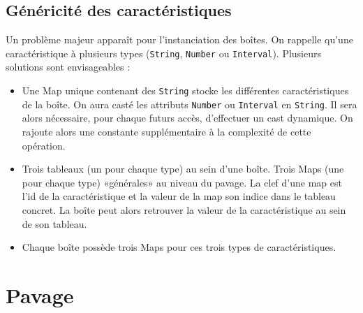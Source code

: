 
\subsection{Généricité des caractéristiques}
Un problème majeur apparaît pour l'instanciation des boîtes. On rappelle qu'une caractéristique à plusieurs types (\verb+String+, \verb+Number+ ou \verb+Interval+). Plusieurs solutions sont envisageables : 
\begin{itemize}
\item
  Une Map unique contenant des \verb+String+ stocke les différentes caractéristiques de la boîte. On aura casté les attributs \verb+Number+ ou \verb+Interval+ en \verb+String+. Il sera alors nécessaire, pour chaque futurs accès, d'effectuer un cast dynamique. On rajoute alors une constante supplémentaire à la complexité de cette opération. 
\item 
Trois tableaux (un pour chaque type) au sein d'une boîte. Trois Maps (une pour chaque type) «générales» au niveau du pavage. La clef d'une map est l'id de la caractéristique et la valeur de la map son indice dans le tableau concret. La boîte peut alors retrouver la valeur de la caractéristique au sein de son tableau.
\item 
  Chaque boîte possède trois Maps pour ces trois types de caractéristiques. 
\end{itemize}


\section{Pavage}
